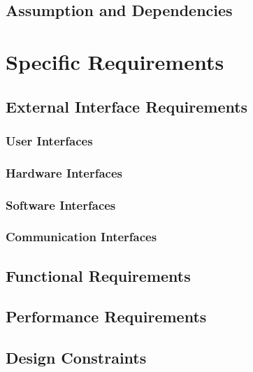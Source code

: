 \documentclass{article}
\begin{document}
\subsubsection{}

\subsection{Assumption and Dependencies}
\subsubsection{}

\section{Specific Requirements}

\subsection{External Interface Requirements}
\subsubsection{User Interfaces}
\subsubsection{Hardware Interfaces}
\subsubsection{Software Interfaces}
\subsubsection{Communication Interfaces}

\subsection{Functional Requirements}

\subsection{Performance Requirements}

\subsection{Design Constraints}
\end{document}
